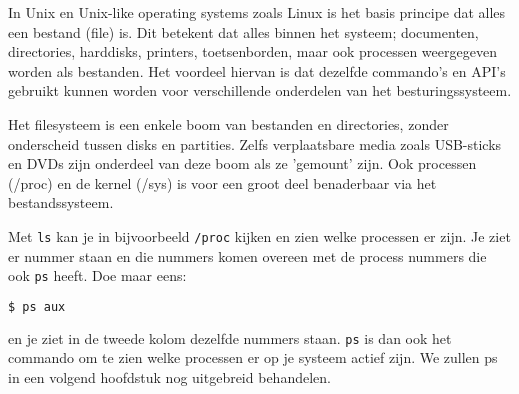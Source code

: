 In Unix en Unix-like operating systems zoals Linux is het basis principe dat alles een bestand (file) is. Dit betekent dat alles binnen het systeem; documenten, directories, harddisks, printers, toetsenborden, maar ook processen weergegeven worden als bestanden. Het voordeel hiervan is dat dezelfde commando's en API's gebruikt kunnen worden voor verschillende onderdelen van het besturingssysteem.

Het filesysteem is een enkele boom van bestanden en directories, zonder onderscheid tussen disks en partities. Zelfs verplaatsbare media zoals USB-sticks en DVDs zijn onderdeel van deze boom als ze 'gemount' zijn. Ook processen (/proc) en de kernel (/sys) is voor een groot deel benaderbaar via het bestandssysteem.

Met \texttt{ls} kan je in bijvoorbeeld \texttt{/proc} kijken en zien welke processen er zijn. Je ziet er nummer staan en die nummers komen overeen met de process nummers die ook \texttt{ps} heeft. Doe maar eens:
\begin{lstlisting}[language=bash]
$ ps aux
\end{lstlisting}
en je ziet in de tweede kolom dezelfde nummers staan. \texttt{ps} is dan ook het commando om te zien welke processen er op je systeem actief zijn. We zullen ps in een volgend hoofdstuk nog uitgebreid behandelen.
